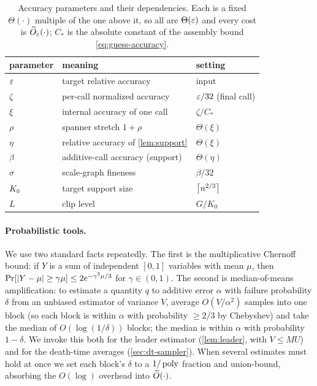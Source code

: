\begin{table}[t]
\centering
\small
\begin{tabular}{lll}
\toprule
parameter & meaning & setting\\
\midrule
$\varepsilon$ & target relative accuracy & input\\
$\zeta$ & per-call normalized accuracy & $\varepsilon/32$ (final call)\\
$\xi$ & internal accuracy of one call & $\zeta/C_*$\\
$\rho$ & spanner stretch $1+\rho$ & $\Theta(\xi)$\\
$\eta$ & relative accuracy of \cref{lem:support} & $\Theta(\xi)$\\
$\beta$ & additive-call accuracy (support) & $\Theta(\eta)$\\
$\sigma$ & scale-graph fineness & $\beta/32$\\
$K_0$ & target support size & $\left\lceil n^{2/3} \right\rceil$\\
$L$ & clip level & $G/K_0$\\
\bottomrule
\end{tabular}
\caption{Accuracy parameters and their dependencies. Each is a fixed $\Theta(\cdot)$ multiple of the one
above it, so all are $\Theta(\varepsilon)$ and every cost is $\widetilde{O}_\varepsilon(\cdot)$; $C_*$ is the absolute constant
of the assembly bound \eqref{eq:guess-accuracy}.}
\label{tab:params}
\end{table}

\paragraph{Probabilistic tools.}
We use two standard facts repeatedly. The first is the multiplicative Chernoff bound: if $Y$ is a sum of
independent $[0,1]$ variables with mean $\mu$, then $\Pr[\left|Y-\mu\right|\ge\gamma\mu]\le 2e^{-\gamma^2\mu/3}$
for $\gamma\in(0,1)$. The second is median-of-means amplification: to estimate a quantity $q$ to additive
error $\alpha$ with failure probability $\delta$ from an unbiased estimator of variance $V$, average
$O(V/\alpha^2)$ samples into one block (so each block is within $\alpha$ with probability $\ge 2/3$ by
Chebyshev) and take the median of $O(\log(1/\delta))$ blocks; the median is within $\alpha$ with
probability $1-\delta$. We invoke this both for the leader estimator (\cref{lem:leader}, with $V\le MU$)
and for the death-time averages (\cref{sec:dt-sampler}). When several estimates must hold at once we set
each block's $\delta$ to a $1/\operatorname{poly}$ fraction and union-bound, absorbing the $O(\log)$ overhead into
$\widetilde{O}(\cdot)$.

